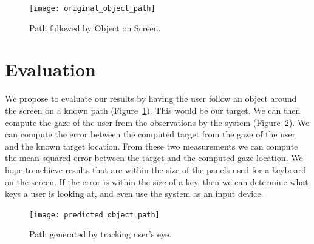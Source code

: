 \documentclass[10pt,twocolumn,letterpaper]{article}
\begin{document}
\begin{figure}
  \begin{center}
    \texttt{[image: original\_object\_path]}
  \end{center}
  \caption{Path followed by Object on Screen.}
  \label{fig:originalpath}
\end{figure}

\section{Evaluation}
We propose to evaluate our results by having the user follow an object
around the screen on a known path (Figure~\ref{fig:originalpath}). 
This would be our target. We can then compute the gaze of the user from 
the observations by the system (Figure~\ref{fig:generatedpath}). 
We can compute the error between the computed target from the
gaze of the user and the known target location. From these two
measurements we can compute the mean squared error between the target
and the computed gaze location. We hope to achieve results that are
within the size of the panels used for a keyboard on the screen. If
the error is within the size of a key, then we can determine what keys
a user is looking at, and even use the system as an input device.


\begin{figure}
  \begin{center}
    \texttt{[image: predicted\_object\_path]}
  \end{center}
  \caption{Path generated by tracking user’s eye.}
  \label{fig:generatedpath}
\end{figure}
\end{document}
